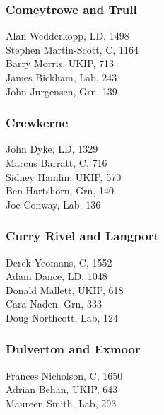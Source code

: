 \documentclass[a4paper,openany,10pt]{book}
\begin{document}
\subsubsection*{Comeytrowe and Trull}



Alan Wedderkopp, LD, 1498\\
Stephen Martin-Scott, C, 1164\\
Barry Morris, UKIP, 713\\
James Bickham, Lab, 243\\
John Jurgensen, Grn, 139\\


\subsubsection*{Crewkerne}



John Dyke, LD, 1329\\
Marcus Barratt, C, 716\\
Sidney Hamlin, UKIP, 570\\
Ben Hartshorn, Grn, 140\\
Joe Conway, Lab, 136\\


\subsubsection*{Curry Rivel and Langport}



Derek Yeomans, C, 1552\\
Adam Dance, LD, 1048\\
Donald Mallett, UKIP, 618\\
Cara Naden, Grn, 333\\
Doug Northcott, Lab, 124\\


\subsubsection*{Dulverton and Exmoor}



Frances Nicholson, C, 1650\\
Adrian Behan, UKIP, 643\\
Maureen Smith, Lab, 293\\
\end{document}
